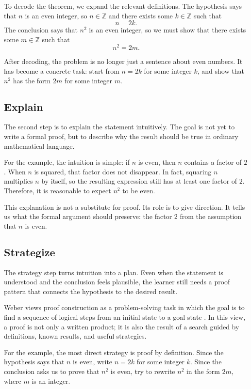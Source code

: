 \documentclass[11pt,a4paper]{article}
\begin{document}
To decode the theorem, we expand the relevant definitions. The hypothesis says that \(n\) is an even integer, so \(n \in \mathbb{Z}\) and there exists some \(k \in \mathbb{Z}\) such that
\[
    n = 2k.
\]
The conclusion says that \(n^2\) is an even integer, so we must show that there exists some \(m \in \mathbb{Z}\) such that
\[
    n^2 = 2m.
\]

After decoding, the problem is no longer just a sentence about even numbers. It has become a concrete task: start from \(n = 2k\) for some integer \(k\), and show that \(n^2\) has the form \(2m\) for some integer \(m\).

\subsection{Explain}

The second step is to explain the statement intuitively. The goal is not yet to write a formal proof, but to describe why the result should be true in ordinary mathematical language.

For the example, the intuition is simple: if \(n\) is even, then \(n\) contains a factor of \(2\). When \(n\) is squared, that factor does not disappear. In fact, squaring \(n\) multiplies \(n\) by itself, so the resulting expression still has at least one factor of \(2\). Therefore, it is reasonable to expect \(n^2\) to be even.

This explanation is not a substitute for proof. Its role is to give direction. It tells us what the formal argument should preserve: the factor \(2\) from the assumption that \(n\) is even.

\subsection{Strategize}

The strategy step turns intuition into a plan. Even when the statement is understood and the conclusion feels plausible, the learner still needs a proof pattern that connects the hypothesis to the desired result.

Weber views proof construction as a problem-solving task in which the goal is to find a sequence of logical steps from an initial state to a goal state \cite{weber2001student}. In this view, a proof is not only a written product; it is also the result of a search guided by definitions, known results, and useful strategies.

For the example, the most direct strategy is proof by definition. Since the hypothesis says that \(n\) is even, write \(n = 2k\) for some integer \(k\). Since the conclusion asks us to prove that \(n^2\) is even, try to rewrite \(n^2\) in the form \(2m\), where \(m\) is an integer.
\end{document}
